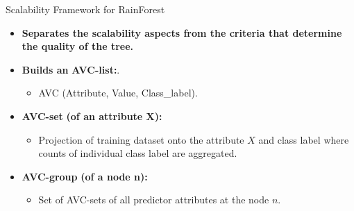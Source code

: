\begin{frame}{Scalability Framework for RainForest}
	\begin{itemize}
		\item \textbf{Separates the scalability aspects from the criteria that determine the quality of the tree.}
		\item \textbf{Builds an} \textbf{\color{airforceblue}AVC-list:}.
		      \begin{itemize}
			      \item AVC (Attribute, Value, Class\_label).
		      \end{itemize}
		\item \textbf{\color{airforceblue}AVC-set} \textbf{(of an attribute X):}
		      \begin{itemize}
			      \item Projection of training dataset onto the attribute $X$ and class label where counts of individual class label are aggregated.
		      \end{itemize}
		\item \textbf{\color{airforceblue}AVC-group} \textbf{(of a node n):}
		      \begin{itemize}
			      \item Set of AVC-sets of all predictor attributes at the node $n$.
		      \end{itemize}
	\end{itemize}
\end{frame}

